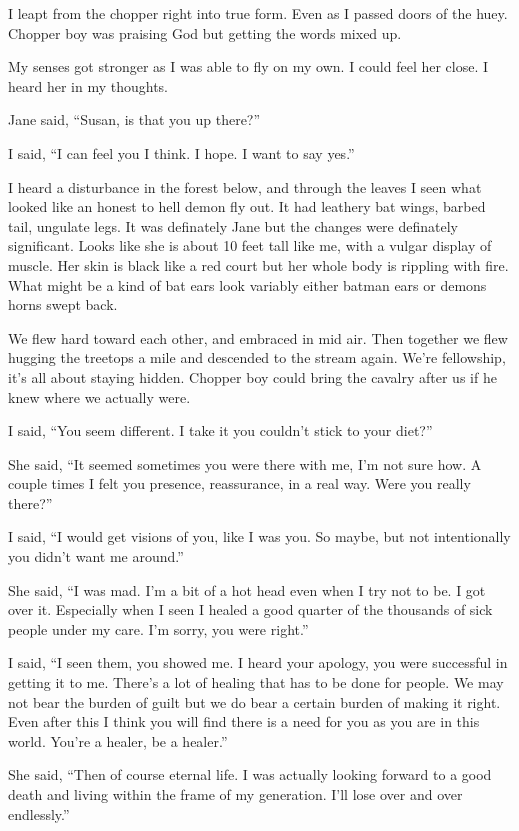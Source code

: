 I leapt from the chopper right into true form. Even as I passed doors of the huey. Chopper boy was praising God but getting the words mixed up.

My senses got stronger as I was able to fly on my own. I could feel her close. I heard her in my thoughts.

Jane said, ``Susan, is that you up there?''

I said, ``I can feel you I think. I hope. I want to say yes.''

I heard a disturbance in the forest below, and through the leaves I seen what looked like an honest to hell demon fly out. It had leathery bat wings, barbed tail, ungulate legs. It was definately Jane but the changes were definately significant. Looks like she is about 10 feet tall like me, with a vulgar display of muscle. Her skin is black like a red court but her whole body is rippling with fire. What might be a kind of bat ears look variably either batman ears or demons horns swept back.

We flew hard toward each other, and embraced in mid air. Then together we flew hugging the treetops a mile and descended to the stream again. We're fellowship, it's all about staying hidden. Chopper boy could bring the cavalry after us if he knew where we actually were.

I said, ``You seem different. I take it you couldn't stick to your diet?''

She said, ``It seemed sometimes you were there with me, I'm not sure how. A couple times I felt you presence, reassurance, in a real way. Were you really there?''

I said, ``I would get visions of you, like I was you. So maybe, but not intentionally you didn't want me around.''

She said, ``I was mad. I'm a bit of a hot head even when I try not to be. I got over it. Especially when I seen I healed a good quarter of the thousands of sick people under my care. I'm sorry, you were right.''

I said, ``I seen them, you showed me. I heard your apology, you were successful in getting it to me. There's a lot of healing that has to be done for people. We may not bear the burden of guilt but we do bear a certain burden of making it right. Even after this I think you will find there is a need for you as you are in this world. You're a healer, be a healer.''

She said, ``Then of course eternal life. I was actually looking forward to a good death and living within the frame of my generation. I'll lose over and over endlessly.''

